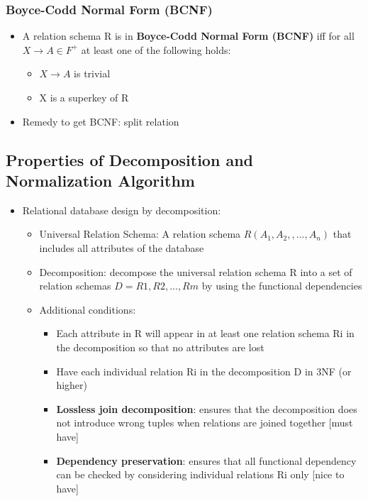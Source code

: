 \subsubsection{Boyce-Codd Normal Form (BCNF)}
\begin{itemize}[label=\(\rhd\)]
    \item A relation schema R is in \textbf{Boyce-Codd Normal Form (BCNF)} iff for all $X\rightarrow A \in F^+$ at least one of the following holds:
    \begin{itemize}[label=\(\rhd\)]
        \item $X\rightarrow A$ is trivial
        \item X is a superkey of R  
    \end{itemize}
    \item Remedy to get BCNF: split relation
\end{itemize}

\subsection{Properties of Decomposition and Normalization Algorithm}
\begin{itemize}[label=\(\rhd\)]
    \item Relational database design by decomposition:
    \begin{itemize}[label=\(\rhd\)]
        \item Universal Relation Schema: A relation schema $R(A_1,A_2,,...,A_n)$ that includes all attributes of the database
        \item Decomposition: decompose the universal relation schema R into a set of relation schemas $D=R1,R2,...,Rm$ by using the functional dependencies
        \item Additional conditions:
        \begin{itemize}[label=\(\rhd\)]
            \item Each attribute in R will appear in at least one relation schema Ri in the decomposition so that no attributes are lost
            \item Have each individual relation Ri in the decomposition D in 3NF (or higher)
            \item \textbf{Lossless join decomposition}: ensures that the decomposition does not introduce wrong tuples when relations are joined together [must have]
            \item \textbf{Dependency preservation}: ensures that all functional dependency can be checked by considering individual relations Ri only [nice to have]
        \end{itemize}
    \end{itemize}
\end{itemize}

